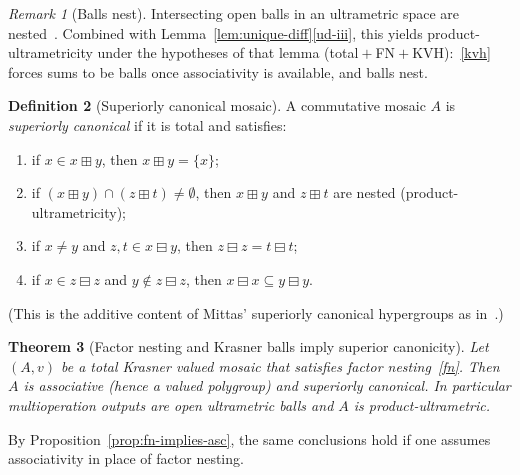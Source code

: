 \documentclass[11pt]{amsart}
\theoremstyle{plain}
\newtheorem{theorem}{Theorem}[section]
\theoremstyle{definition}
\newtheorem{definition}[theorem]{Definition}
\theoremstyle{remark}
\newtheorem{remark}[theorem]{Remark}
\begin{document}
\begin{remark}[Balls nest]
\label{rem:kvh-total}
Intersecting open balls in an ultrametric space are nested~\cite[Lemma~4.5(iii)]{Lin23}. Combined with Lemma~\ref{lem:unique-diff}\eqref{ud-iii}, this yields product-ultrametricity under the hypotheses of that lemma (total\({}+{}\)FN\({}+{}\)KVH):~\eqref{kvh} forces sums to be balls once associativity is available, and balls nest.
\end{remark}

\begin{definition}[Superiorly canonical mosaic]
\label{def:sch}
A commutative mosaic \(A\) is \emph{superiorly canonical} if it is total and satisfies:
\begin{enumerate}[label=(SCH\arabic*)]
\item\label{sch1} if \(x\in x\boxplus y\), then \(x\boxplus y=\{x\}\);
\item\label{sch2} if \((x\boxplus y)\cap(z\boxplus t)\neq\emptyset\), then \(x\boxplus y\) and \(z\boxplus t\) are nested (product-ultrametricity);
\item\label{sch3} if \(x\neq y\) and \(z,t\in x\boxminus y\), then \(z\boxminus z=t\boxminus t\);
\item\label{sch4} if \(x\in z\boxminus z\) and \(y\notin z\boxminus z\), then \(x\boxminus x\subseteq y\boxminus y\).
\end{enumerate}
\end{definition}

(This is the additive content of Mittas' superiorly canonical hypergroups as in~\cite[Definition~4.17]{Lin23}.)

\begin{theorem}[Factor nesting and Krasner balls imply superior canonicity]
\label{thm:kvh-sch}
Let \((A,v)\) be a total Krasner valued mosaic that satisfies factor nesting~\eqref{fn}.
Then \(A\) is associative (hence a valued polygroup) and superiorly canonical.
In particular multioperation outputs are open ultrametric balls and \(A\) is product-ultrametric.
\end{theorem}

By Proposition~\ref{prop:fn-implies-asc}, the same conclusions hold if one assumes associativity in place of factor nesting.
\end{document}
